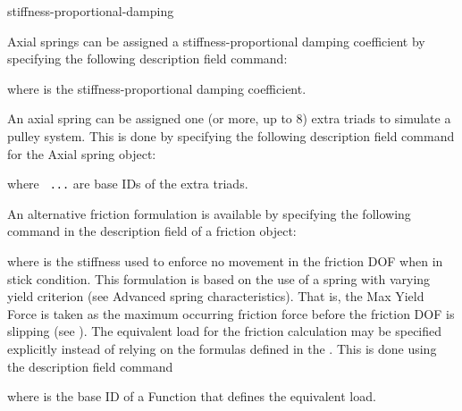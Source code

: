

           {stiffness-proportional-damping}

Axial springs can be assigned a stiffness-proportional damping
coefficient by specifying the following description field command:


\noindent
where {\tt{}} is the stiffness-proportional damping coefficient.



An axial spring can be assigned one (or more, up to 8) extra triads to simulate
a pulley system. This is done by specifying the following description field
command for the Axial spring object:


\noindent
where {\tt{}  ...} are base IDs of the extra triads.



An alternative friction formulation is available by specifying the
following command in the description field of a friction object:


\noindent
where {\tt{}} is the stiffness used to enforce no movement in
the friction DOF when in stick condition.
This formulation is based on the use of a spring with varying yield criterion
(see 
{Advanced spring characteristics}). That is, the Max Yield Force is
taken as the maximum occurring friction force before the friction DOF
is slipping (see ).
The equivalent load for the friction calculation may be specified
explicitly instead of relying on the formulas defined in the
.
This is done using the description field command


\noindent
where {\tt{}} is the base ID of a Function that defines
the equivalent load.



